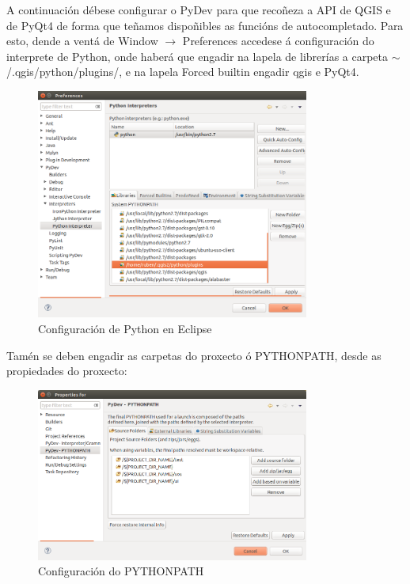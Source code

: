 A continuación débese configurar o PyDev para que recoñeza a API de QGIS e de PyQt4 de forma que teñamos dispoñibles as funcións de autocompletado. Para esto, dende a ventá de Window $\to$ Preferences accedese á configuración do interprete de Python, onde haberá que engadir na lapela de librerías a carpeta $\sim$/.qgis/python/plugins/, e na lapela Forced builtin engadir qgis e PyQt4.
\begin{figure}[H]
\centering
\includegraphics[width=0.8\textwidth]{images/manualtecnico/python_settings.png}
\caption{Configuración de Python en Eclipse}
\label{fig:python_settings}
\end{figure}

Tamén se deben engadir as carpetas do proxecto ó PYTHONPATH, desde as propiedades do proxecto:
\begin{figure}[H]
\centering
\includegraphics[width=0.8\textwidth]{images/manualtecnico/python_path.png}
\caption{Configuración do PYTHONPATH}
\label{fig:python_path}
\end{figure}


